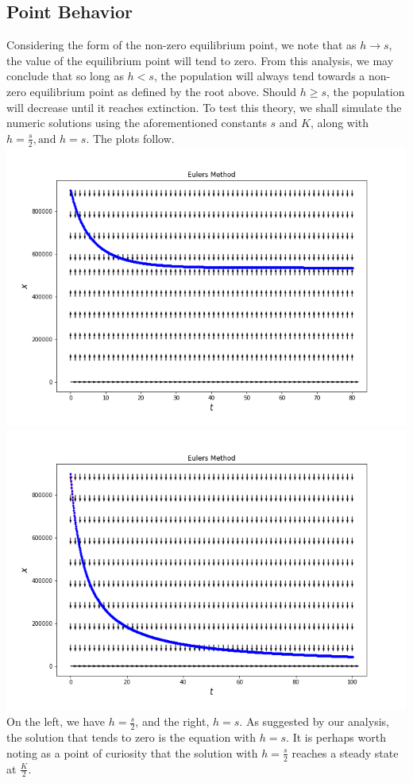 \documentclass[letterpaper,12pt]{article}
\begin{document}
\subsection{Point Behavior}
Considering the form of the non-zero equilibrium point, we note that as $h\to s$, the value of the equilibrium point will tend to zero. From this analysis, we may conclude that so long as $h<s$, the population will always tend towards a non-zero equilibrium point as defined by the root above. Should $h\geq s$, the population will decrease until it reaches extinction. To test this theory, we shall simulate the numeric solutions using the aforementioned constants $s$ and $K$, along with $h=\frac{s}{2},\text{and }h=s$. The plots follow.\\
\includegraphics[scale=.4]{4b1.png}
\includegraphics[scale=.4]{4b2.png}
On the left, we have $h=\frac{s}{2}$, and the right, $h=s$. As suggested by our analysis, the solution that tends to zero is the equation with $h=s$. It is perhaps worth noting as a point of curiosity that the solution with $h=\frac{s}{2}$ reaches a steady state at $\frac{K}{2}$.
\end{document}
